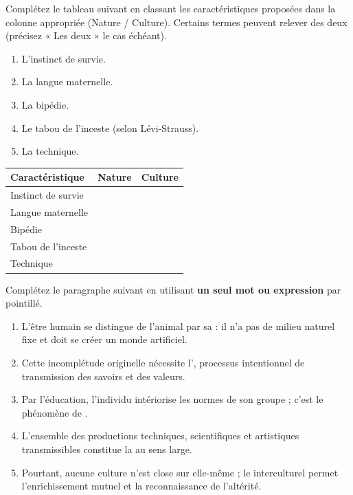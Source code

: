 \documentclass[11pt]{article}
\begin{document}
\begin{exercice}
Complétez le tableau suivant en classant les caractéristiques proposées dans la colonne appropriée (Nature / Culture). Certains termes peuvent relever des deux (précisez « Les deux » le cas échéant).
\begin{enumerate}
    \item L'instinct de survie.
    \item La langue maternelle.
    \item La bipédie.
    \item Le tabou de l'inceste (selon Lévi-Strauss).
    \item La technique.
\end{enumerate}
\begin{center}
\begin{tabular}{|l|c|c|}
\hline
\textbf{Caractéristique} & \textbf{Nature} & \textbf{Culture} \\ \hline
Instinct de survie & & \\ \hline
Langue maternelle & & \\ \hline
Bipédie & & \\ \hline
Tabou de l'inceste & & \\ \hline
Technique & & \\ \hline
\end{tabular}
\end{center}
\end{exercice}

\begin{exercice}
Complétez le paragraphe suivant en utilisant \textbf{un seul mot ou expression} par pointillé.
\begin{enumerate}
    \item L'être humain se distingue de l'animal par sa \underline{\hspace{4cm}} : il n'a pas de milieu naturel fixe et doit se créer un monde artificiel.
    \item Cette incomplétude originelle nécessite l'\underline{\hspace{4cm}}, processus intentionnel de transmission des savoirs et des valeurs.
    \item Par l'éducation, l'individu intériorise les normes de son groupe ; c'est le phénomène de \underline{\hspace{4cm}}.
    \item L'ensemble des productions techniques, scientifiques et artistiques transmissibles constitue la \underline{\hspace{4cm}} au sens large.
    \item Pourtant, aucune culture n'est close sur elle-même ; le \underline{\hspace{4cm}} interculturel permet l'enrichissement mutuel et la reconnaissance de l'altérité.
\end{enumerate}
\end{exercice}
\end{document}
